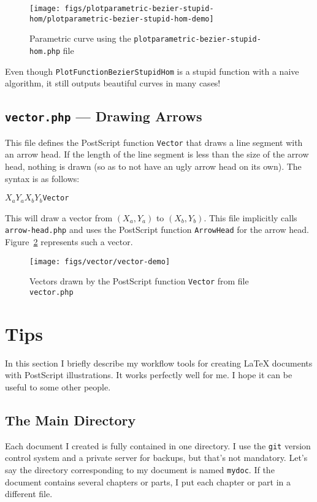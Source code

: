 \documentclass[10pt,a4paper]{scrartcl}
\newcommand\PS{PostScript}
\begin{document}
\begin{figure}[ht!]%
\centering
\texttt{[image: figs/plotparametric-bezier-stupid-hom/plotparametric-bezier-stupid-hom-demo]}%
\caption{Parametric curve using the \texttt{plotparametric-bezier-stupid-hom.php} file}%
\label{fig:plotparametric-bezier-stupid-hom-demo}%
\end{figure}

Even though \texttt{PlotFunctionBezierStupidHom} is a stupid function with a
naive algorithm, it still outputs beautiful curves in many cases!


\subsection{\texttt{vector.php} --- Drawing Arrows}
This file defines the \PS{} function \texttt{Vector} that draws a line segment
with an arrow head. If the length of the line segment is less than the size
of the arrow head, nothing is drawn (so as to not have an ugly arrow head on its own).
The syntax is as follows:
\begin{center}
$X_a$\quad$Y_a$\quad$X_b$\quad$Y_b$\quad\texttt{Vector}
\end{center}
This will draw a vector from $(X_a,Y_a)$ to $(X_b,Y_b)$. This file implicitly calls
\texttt{arrow-head.php} and uses the \PS{} function \texttt{ArrowHead} for the arrow head.
Figure~\ref{fig:vector-demo} represents such a vector.
\begin{figure}[ht!]%
\centering
\texttt{[image: figs/vector/vector-demo]}%
\caption{Vectors drawn by the \PS{} function \texttt{Vector} from file \texttt{vector.php}}%
\label{fig:vector-demo}%
\end{figure}

\section{Tips}
In this section I briefly describe my workflow tools for creating \LaTeX{}
documents with \PS{} illustrations. It works perfectly well for me. I hope it can
be useful to some other people.
\subsection{The Main Directory}
Each document I created is fully contained in one directory. I use the
\texttt{git} version control system and a private server for backups, but
that's not mandatory. Let's say the directory corresponding to my document
is named \texttt{mydoc}. If the document contains several chapters or parts,
I put each chapter or part in a different file.
\end{document}
